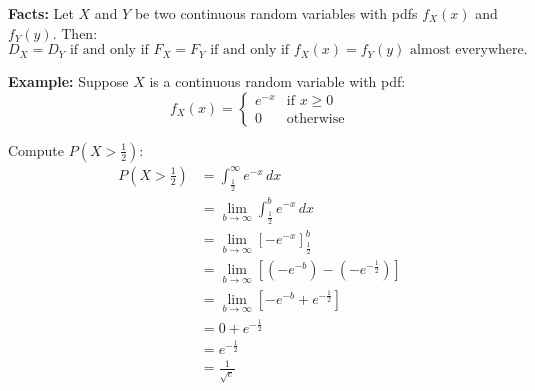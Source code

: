 \documentclass{article}
\begin{document}
    \textbf{Facts:} Let \(X\) and \(Y\) be two continuous random variables with pdfs \(f_X(x)\) and \(f_Y(y)\). Then:
    \[
        D_X = D_Y \text{ if and only if } F_X = F_Y \text{ if and only if } f_X(x) = f_Y(y) \text{ almost everywhere.}
    \]

    \textbf{Example:} Suppose \(X\) is a continuous random variable with pdf:
    \[
        f_X(x) = 
        \begin{cases} 
            e^{-x} & \text{if } x \geq 0 \\
            0 & \text{otherwise}
        \end{cases}
    \]

    Compute \(P(X > \frac{1}{2})\):
    \begin{align*}
        P(X > \frac{1}{2}) &= \int_{\frac{1}{2}}^{\infty} e^{-x} \, dx \\
        &= \lim_{b \to \infty} \int_{\frac{1}{2}}^{b} e^{-x} \, dx \\
        &= \lim_{b \to \infty} \left[ -e^{-x} \right]_{\frac{1}{2}}^{b} \\
        &= \lim_{b \to \infty} \left[ (-e^{-b}) - (-e^{-\frac{1}{2}}) \right] \\
        &= \lim_{b \to \infty} \left[ -e^{-b} + e^{-\frac{1}{2}} \right] \\
        &= 0 + e^{-\frac{1}{2}} \\
        &= e^{-\frac{1}{2}} \\
        &= \frac{1}{\sqrt{e}}
    \end{align*}
\end{document}
